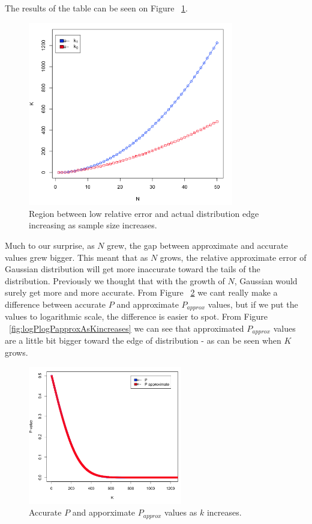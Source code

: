 \documentclass[12pt]{article}
\begin{document}
The results of the table can be seen on Figure ~\ref{fig:T0vsN}.

\begin{figure}[H]
	\centering
  \includegraphics[width=0.8\textwidth]{T0vsN}
	\caption{Region between low relative error and actual distribution edge increasing as sample size increases.}
	\label{fig:T0vsN}
\end{figure}

Much to our surprise, as $N$ grew, the gap between approximate and accurate values grew bigger. This meant that as $N$ grows, the relative approximate error of Gaussian distribution will get more inaccurate toward the tails of the distribution. Previously we thought that with the growth of $N$, Gaussian would surely get more and more accurate.
From Figure ~\ref{fig:PandPapproxAsKincreases} we cant really make a difference between accurate $P$ and approximate $P_{approx}$ values, but if we put the values to logarithmic scale, the difference is easier to spot. From Figure ~\ref{fig:logPlogPapproxAsKincreases} we can see that approximated $P_{approx}$ values are a little bit bigger toward the edge of distribution - as can be seen when $K$ grows.

\begin{figure}[H]
  \centering
  \includegraphics[width=0.6\textwidth]{PandPapproxAsKincreases}
  \caption{Accurate $P$ and apporximate $P_{approx}$ values as $k$ increases.}
  \label{fig:PandPapproxAsKincreases}
\end{figure}
\end{document}
